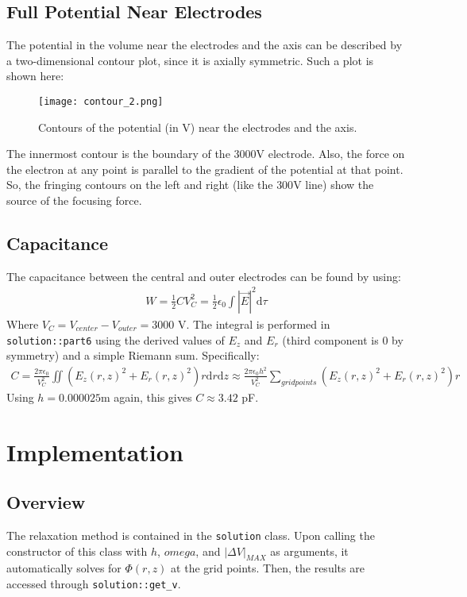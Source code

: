 \documentclass[12pt]{article}
\begin{document}
\subsection{Full Potential Near Electrodes}
The potential in the volume near the electrodes and the axis can be described by a two-dimensional contour plot, since it is axially symmetric. Such a plot is shown here:
\begin{figure}[H]
  \centering
  \texttt{[image: contour\_2.png]}
  \caption{Contours of the potential (in V) near the electrodes and the axis.}
\end{figure}
The innermost contour is the boundary of the $3000$V electrode. Also, the force on the electron at any point is parallel to the gradient of the potential at that point. So, the fringing contours on the left and right (like the $300$V line) show the source of the focusing force.
\subsection{Capacitance}
The capacitance between the central and outer electrodes can be found by using:
\begin{align*}
W = \frac{1}{2}CV_C^2 = \frac{1}{2}\epsilon_0\int|\vec{E}|^2 \text{d}\tau
\end{align*}
Where $V_C = V_{center} - V_{outer} = 3000$ V. The integral is performed in \texttt{solution::part6} using the derived values of $E_z$ and $E_r$ (third component is $0$ by symmetry) and a simple Riemann sum. Specifically:
\begin{align*}
C = \frac{2\pi \epsilon_0}{V_C^2} \iint \left(E_z(r, z)^2 + E_r(r, z)^2 \right) r \text{d}r \text{d}z \approx \frac{2\pi \epsilon_0 h^2}{V_C^2} \sum_{grid points} \left(E_z(r, z)^2 + E_r(r, z)^2 \right) r
\end{align*}
Using $h = 0.000025$m again, this gives $C \approx 3.42$ pF.
\section{Implementation}
\subsection{Overview}
The relaxation method is contained in the \texttt{solution} class. Upon calling the constructor of this class with $h$, $omega$, and $|\Delta V|_{MAX}$ as arguments, it automatically solves for $\Phi(r, z)$ at the grid points. Then, the results are accessed through \texttt{solution::get\_v}. \\
\end{document}
